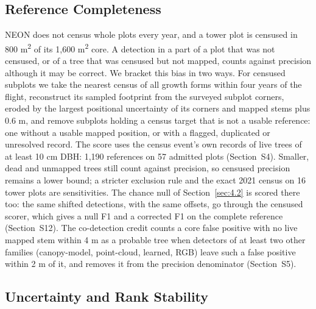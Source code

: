 \documentclass[journal]{IEEEtran}
\begin{document}
\subsection{Reference Completeness}\label{sec:4.3}

NEON does not census whole plots every year, and a tower plot is censused in 800
m\textsuperscript{2} of its 1,600 m\textsuperscript{2} core. A detection in a part of a plot that was not censused,
or of a tree that was censused but not mapped, counts against precision although
it may be correct. We bracket this bias in two ways. For censused subplots we
take the nearest census of all growth forms within four years of the flight,
reconstruct its sampled footprint from the surveyed subplot corners, eroded by
the largest positional uncertainty of its corners and mapped stems plus 0.6 m,
and remove subplots holding a census target that is not a usable reference: one
without a usable mapped position, or with a flagged, duplicated or unresolved
record. The score uses the census event's own records of live trees of at least
10 cm DBH: 1,190 references on 57 admitted plots (Section~S4). Smaller, dead and
unmapped trees still count against precision, so censused precision remains a
lower bound; a stricter exclusion rule and the exact 2021 census on 16 tower
plots are sensitivities. The chance null of Section~\ref{sec:4.2} is scored there too: the
same shifted detections, with the same offsets, go through the censused scorer,
which gives a null F1 and a corrected F1 on the complete reference (Section~S12). The co-detection credit counts a core false positive with no live mapped
stem within 4 m as a probable tree when detectors of at least two other families
(canopy-model, point-cloud, learned, RGB) leave such a false positive within 2 m
of it, and removes it from the precision denominator (Section~S5).

\subsection{Uncertainty and Rank Stability}\label{sec:4.4}
\end{document}

